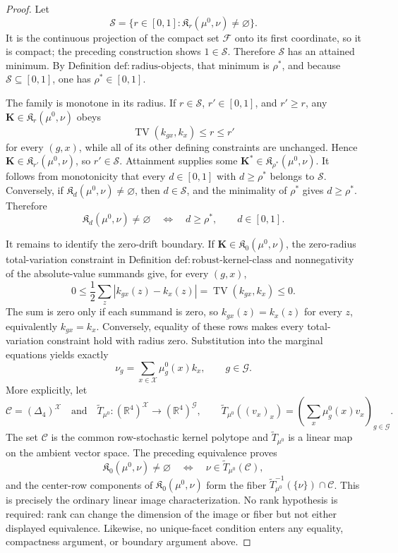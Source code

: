 \documentclass{article}
\begin{document}
\begin{proof}
Let
\[
 \mathcal S=\{r\in[0,1]:\mathfrak K_r(\mu^0,\nu)\ne\varnothing\}.
\]
It is the continuous projection of the compact set \(\mathcal F\) onto its first coordinate, so it is compact; the preceding construction shows \(1\in\mathcal S\).  Therefore \(\mathcal S\) has an attained minimum.  By Definition \(\mathrm{def:radius\mbox{-}objects}\), that minimum is \(\rho^*\), and because \(\mathcal S\subseteq[0,1]\), one has \(\rho^*\in[0,1]\).

The family is monotone in its radius.  If \(r\in\mathcal S\), \(r'\in[0,1]\), and \(r'\ge r\), any \(\mathbf K\in\mathfrak K_r(\mu^0,\nu)\) obeys
\[
 \operatorname{TV}(k_{gx},k_x)\le r\le r'
\]
for every \((g,x)\), while all of its other defining constraints are unchanged.  Hence \(\mathbf K\in\mathfrak K_{r'}(\mu^0,\nu)\), so \(r'\in\mathcal S\).  Attainment supplies some \(\mathbf K^*\in\mathfrak K_{\rho^*}(\mu^0,\nu)\).  It follows from monotonicity that every \(d\in[0,1]\) with \(d\ge\rho^*\) belongs to \(\mathcal S\).  Conversely, if \(\mathfrak K_d(\mu^0,\nu)\ne\varnothing\), then \(d\in\mathcal S\), and the minimality of \(\rho^*\) gives \(d\ge\rho^*\).  Therefore
\[
 \mathfrak K_d(\mu^0,\nu)\ne\varnothing
 \quad\Longleftrightarrow\quad d\ge\rho^*,
 \qquad d\in[0,1].
\]

It remains to identify the zero-drift boundary.  If \(\mathbf K\in\mathfrak K_0(\mu^0,\nu)\), the zero-radius total-variation constraint in Definition \(\mathrm{def:robust\mbox{-}kernel\mbox{-}class}\) and nonnegativity of the absolute-value summands give, for every \((g,x)\),
\[
 0\le\frac12\sum_z|k_{gx}(z)-k_x(z)|
 =\operatorname{TV}(k_{gx},k_x)\le0.
\]
The sum is zero only if each summand is zero, so \(k_{gx}(z)=k_x(z)\) for every \(z\), equivalently \(k_{gx}=k_x\).  Conversely, equality of these rows makes every total-variation constraint hold with radius zero.  Substitution into the marginal equations yields exactly
\[
 \nu_g=\sum_{x\in\mathcal X}\mu_g^0(x)k_x,
 \qquad g\in\mathcal G.
\]
More explicitly, let
\[
 \mathcal C=(\Delta_4)^{\mathcal X}
 \quad\text{and}\quad
 \widetilde T_{\mu^0}:(\mathbb R^4)^{\mathcal X}
 \longrightarrow(\mathbb R^4)^{\mathcal G},
 \qquad
 \widetilde T_{\mu^0}((v_x)_x)
 =\left(\sum_x\mu_g^0(x)v_x\right)_{g\in\mathcal G}.
\]
The set \(\mathcal C\) is the common row-stochastic kernel polytope and \(\widetilde T_{\mu^0}\) is a linear map on the ambient vector space.  The preceding equivalence proves
\[
 \mathfrak K_0(\mu^0,\nu)\ne\varnothing
 \quad\Longleftrightarrow\quad
 \nu\in \widetilde T_{\mu^0}(\mathcal C),
\]
and the center-row components of \(\mathfrak K_0(\mu^0,\nu)\) form the fiber \(\widetilde T_{\mu^0}^{-1}(\{\nu\})\cap\mathcal C\).  This is precisely the ordinary linear image characterization.  No rank hypothesis is required: rank can change the dimension of the image or fiber but not either displayed equivalence.  Likewise, no unique-facet condition enters any equality, compactness argument, or boundary argument above.
\end{proof}
\end{document}
